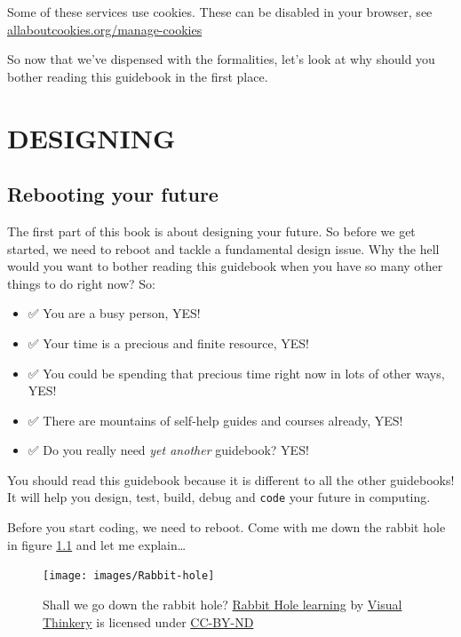 \documentclass[
]{book}
\providecommand{\tightlist}{%
  \setlength{\itemsep}{0pt}\setlength{\parskip}{0pt}}
\begin{document}
Some of these services use cookies. These can be disabled in your browser, see \href{https://www.allaboutcookies.org/manage-cookies/}{allaboutcookies.org/manage-cookies}

So now that we've dispensed with the formalities, let's look at why should you bother reading this guidebook in the first place.











\hypertarget{part-designing}{%
\part{DESIGNING}\label{part-designing}}

\hypertarget{rebooting}{%
\chapter{Rebooting your future}\label{rebooting}}

The first part of this book is about designing your future. So before we get started, we need to reboot and tackle a fundamental design issue. Why the hell would you want to bother reading this guidebook when you have so many other things to do right now? So:

\begin{itemize}
\tightlist
\item
  ✅ You are a busy person, YES!
\item
  ✅ Your time is a precious and finite resource, YES!
\item
  ✅ You could be spending that precious time right now in lots of other ways, YES!
\item
  ✅ There are mountains of self-help guides and courses already, YES!
\item
  ✅ Do you really need \emph{yet another} guidebook? YES!
\end{itemize}

You should read this guidebook because it is different to all the other guidebooks! It will help you design, test, build, debug and \texttt{code} your future in computing.

Before you start coding, we need to reboot. Come with me down the rabbit hole in figure \ref{fig:rabbit-fig} and let me explain\ldots{} 🐇

\begin{figure}

{\centering \texttt{[image: images/Rabbit-hole]} 

}

\caption{Shall we go down the rabbit hole? \href{https://bryanmmathers.com/rabbit-hole-learning/}{Rabbit Hole learning} by \href{https://visualthinkery.com}{Visual Thinkery} is licensed under \href{https://creativecommons.org/licenses/by-nd/4.0/}{CC-BY-ND}}\label{fig:rabbit-fig}
\end{figure}
\end{document}
